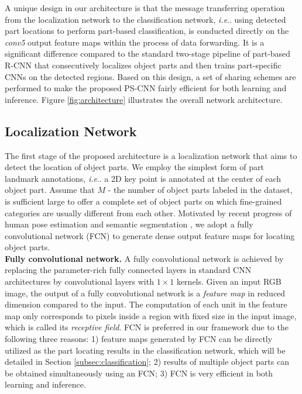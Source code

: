 \documentclass[10pt,twocolumn,letterpaper]{article}
\makeatletter
\DeclareRobustCommand\onedot{\futurelet\@let@token\@onedot}
\def\@onedot{\ifx\@let@token.\else.\null\fi\xspace}
\def\ie{\emph{i.e}\onedot} \def\Ie{\emph{I.e}\onedot}
\makeatother
\begin{document}
A unique design in our architecture is that the message transferring operation from the localization network to the classification network, \ie using detected part locations to perform part-based classification, is conducted directly on the \textit{conv5} output feature maps within the process of data forwarding. It is a significant difference compared to the standard two-stage pipeline of part-based R-CNN \cite{zhang2014part} that consecutively localizes object parts and then trains part-specific CNNs on the detected regions. Based on this design, a set of sharing schemes are performed to make the proposed PS-CNN fairly efficient for both learning and inference. Figure \ref{fig:architecture} illustrates the overall network architecture.








\subsection{Localization Network} \label{subsec:localization}
The first stage of the proposed architecture is a localization network that aims to detect the location of object parts. We employ the simplest form of part landmark annotations, \ie a 2D key point is annotated at the center of each object part. Assume that $M$ - the number of object parts labeled in the dataset, is sufficient large to offer a complete set of object parts on which fine-grained categories are usually different from each other.
Motivated by recent progress of human pose estimation \cite{long2015fully} and semantic segmentation \cite{tompson2014joint}, we adopt a fully convolutional network (FCN) \cite{matan1995multi} to generate dense output feature maps for locating object parts.\\



\noindent\textbf{Fully convolutional network.}
A fully convolutional network is achieved by replacing the parameter-rich fully connected layers in standard CNN architectures by convolutional layers with $1\times1$ kernels. Given an input RGB image, the output of a fully convolutional network is a \textit{feature map} in reduced dimension compared to the input. The computation of each unit in the feature map only corresponds to pixels inside a region with fixed size in the input image, which is called its \textit{receptive field}.
FCN is preferred in our framework due to the following three reasons: 1) feature maps generated by FCN can be directly utilized as the part locating results in the classification network, which will be detailed in Section \ref{subsec:classification}; 2) results of multiple object parts can be obtained simultaneously using an FCN; 3) FCN is very efficient in both learning and inference. \\
\end{document}
